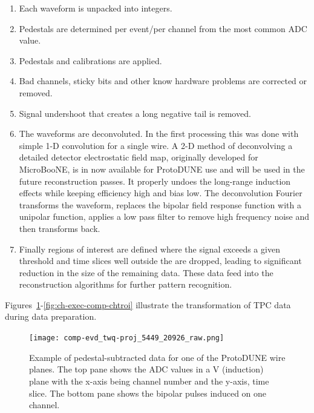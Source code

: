 \begin{enumerate}
\item Each waveform is unpacked into integers.
\item Pedestals are determined per event/per channel from the most common ADC value. 
\item Pedestals and calibrations are applied. %
\item Bad channels, sticky bits and other know hardware problems are corrected or removed.
\item Signal undershoot that creates a long negative tail is removed. 
\item The waveforms  are deconvoluted.  In the first processing this was done with simple 1-D  convolution for a single wire.  A 2-D method of deconvolving a detailed detector electrostatic field map, originally developed for MicroBooNE, is in now available for ProtoDUNE use and will be used in the future reconstruction passes.  It properly undoes the long-range induction effects while keeping efficiency high and bias low.  The deconvolution Fourier transforms the waveform, replaces the  bipolar field response function with a unipolar function, applies a low pass filter to remove high frequency noise and then transforms back.




\item Finally regions of interest are defined where the signal exceeds a given threshold and time slices well outside the  are dropped, leading to significant reduction in the size of the remaining data. These data feed into the reconstruction algorithms for further pattern recognition. %
\end{enumerate}




Figures~\ref{fig:ch-exec-comp-chtraw}-\ref{fig:ch-exec-comp-chtroi} illustrate the transformation of TPC data  during data
preparation.

\begin{figure}[t]
\texttt{[image: comp-evd\_twq-proj\_5449\_20926\_raw.png]}
\caption{
Example of pedestal-subtracted data for one of the ProtoDUNE  wire planes.  The top pane shows the ADC values in a V (induction) plane with the x-axis being channel number and the y-axis, time slice. The bottom pane shows the bipolar pulses induced on one channel. 
}
\label{fig:ch-exec-comp-chtraw}
\end{figure}




